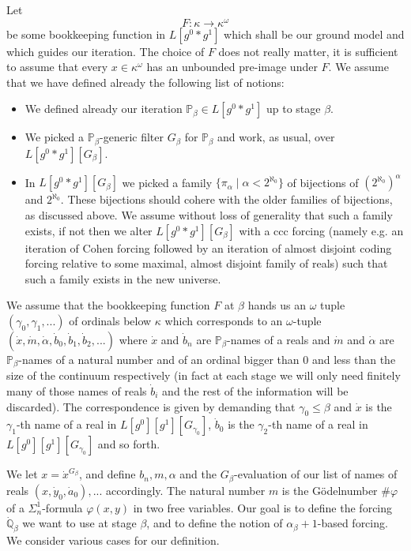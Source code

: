 \documentclass[a4paper,11pt]{article}
\newcommand{\forceP}{\mathbb{P}}
\newcommand{\forceQ}{\mathbb{Q}}
\begin{document}
Let \[F : \kappa \rightarrow \kappa^{\omega} \] be some bookkeeping function in $L[g^0\ast g^1]$ which shall be our ground model and which guides our iteration. The choice of $F$ does not really matter, it is sufficient to assume that every $x \in \kappa^{\omega}$ has an unbounded pre-image under $F$.
We assume that we have defined already the following list of notions:
\begin{itemize}

\item We defined already our iteration $\forceP_{\beta} \in L[g^0 \ast g^1]$ up to stage $\beta$.
\item We picked a $\forceP_{\beta}$-generic filter $G_{\beta}$ for $\forceP_{\beta}$ and work, as usual, over $L[g^0\ast g^1][G_{\beta}]$.
\item In $L[g^0 \ast g^1] [G_{\beta}]$ we picked a family $\{ \pi_{\alpha} \mid \alpha < 2^{\aleph_0} \}$ of bijections 
of $(2^{\aleph_0})^{\alpha}$ and $2^{\aleph_0}$. These bijections should cohere with the older families of bijections, as discussed above. We assume without loss of generality that such a family exists, if not then we alter $L[g^0 \ast g^1][G_{\beta}]$ with a ccc forcing (namely e.g. an iteration of Cohen forcing followed by an iteration of almost disjoint coding forcing relative to some maximal, almost disjoint family of reals) such that such a family exists in the new universe.
\end{itemize}

We assume  that the bookkeeping function $F$ at $\beta$ hands us an $\omega$ tuple $(\gamma_0,\gamma_1,...)$ of ordinals below $\kappa$ which corresponds to an $ \omega$-tuple $(\dot{x},\dot{m}, \dot{\alpha}, \dot{b}_0,\dot{b}_1,\dot{b}_2,...)$ where $\dot{x}$ and $\dot{b}_n$ are $\forceP_{\beta}$-names of a reals and $\dot{m}$ and $\dot{\alpha}$ are $\forceP_{\beta}$-names of a natural number and of an ordinal  bigger than 0 and less than the size of the continuum respectively  (in fact at each stage we will only need finitely many of those names of reals $\dot{b}_i$ and the rest of the information will be discarded). The correspondence is given by demanding that $\gamma_0 \le \beta$ and  $\dot{x}$ is the $\gamma_1$-th name of a real in $L[g^0][g^1][G_{\gamma_0}]$, $\dot{b}_0$ is the $\gamma_2$-th name of a real in $L[g^0][g^1][G_{\gamma_0}]$ and so forth.

We let $x=\dot{x}^{G_{\beta}}$, and define $b_n,m,\alpha$ and the $G_{\beta}$-evaluation of our list of names of reals $(x,\dot{y}_0,\dot{a}_0),...$ accordingly. 
The natural number $m$ is the G\"odelnumber $\# \varphi$ of a $\Sigma^1_n$-formula $\varphi(x,y)$ in two free variables.
Our goal is to define the forcing $\dot{\forceQ}_{\beta}$ we want to use at stage $\beta$, and to define the notion of $\alpha_{\beta}+1$-based forcing.
We consider various cases for our definition.
\end{document}
